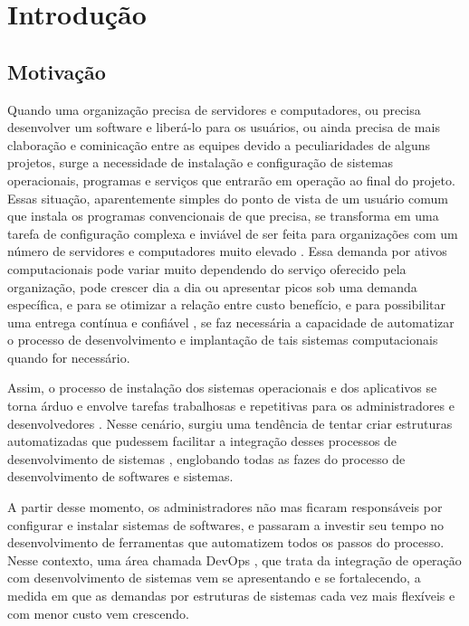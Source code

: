 \chapter{Introdução}

\section{Motivação}

Quando uma organização precisa de servidores e computadores, 
ou precisa desenvolver um software e liberá-lo para os usuários, 
 ou ainda precisa de mais claboração e cominicação entre as equipes 
 devido a peculiaridades de alguns projetos, surge a necessidade de 
instalação e configuração de sistemas operacionais, programas 
e serviços que entrarão em operação ao final do projeto. Essas situação, 
aparentemente simples do ponto de vista de um usuário comum
que instala os programas convencionais de que precisa, se 
transforma em uma tarefa de configuração complexa e inviável 
de ser feita para organizações com um número de servidores e 
computadores muito elevado \cite{humble2011enterprises}. 
Essa demanda por ativos 
computacionais pode variar muito dependendo do serviço 
oferecido pela organização, pode crescer dia a dia ou 
apresentar picos sob uma demanda específica, e para se 
otimizar a relação entre custo benefício, e para possibilitar 
uma entrega contínua e confiável \cite{humble2010continuous},
se faz necessária a capacidade de automatizar o processo de 
desenvolvimento e implantação de tais sistemas 
computacionais quando for necessário. 

Assim, o processo de  
instalação dos sistemas operacionais e dos aplicativos se 
torna árduo e envolve tarefas trabalhosas e repetitivas 
para os administradores e desenvolvedores \cite{httermann2012devops}. 
Nesse cenário, surgiu uma tendência de tentar criar 
estruturas automatizadas que pudessem facilitar a 
integração desses processos de desenvolvimento de sistemas 
\cite{humble2011enterprises}, englobando todas as 
fazes do processo de desenvolvimento de softwares 
e sistemas. 

A partir desse momento, os administradores não 
mas ficaram responsáveis por configurar e instalar sistemas 
de softwares, e passaram a investir seu tempo no 
desenvolvimento de ferramentas que automatizem todos os 
passos do processo. Nesse contexto, uma área chamada 
DevOps \cite{loukides2012devops}, que trata  da integração 
de operação com desenvolvimento de sistemas vem se 
apresentando e se fortalecendo, a medida em que as demandas 
por estruturas de sistemas cada vez mais flexíveis e com 
menor custo vem crescendo.


